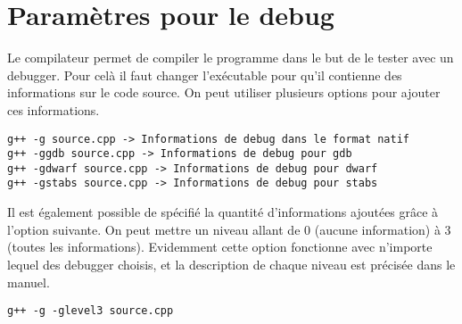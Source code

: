 \documentclass[a4paper, 12pt]{article}
\begin{document}
\section{Paramètres pour le debug}
    Le compilateur permet de compiler le programme dans le but de le tester avec un debugger. Pour celà il faut changer l'exécutable pour qu'il contienne des informations sur le code source.
    On peut utiliser plusieurs options pour ajouter ces informations.
    \begin{mdframed}[backgroundcolor=light-gray, roundcorner=20pt,
        innerleftmargin=20, innertopmargin=1, innerbottommargin=1, 
        outerlinewidth=1, linecolor=darkgray]
        \begin{lstlisting}
g++ -g source.cpp -> Informations de debug dans le format natif
g++ -ggdb source.cpp -> Informations de debug pour gdb
g++ -gdwarf source.cpp -> Informations de debug pour dwarf 
g++ -gstabs source.cpp -> Informations de debug pour stabs
        \end{lstlisting}
    \end{mdframed}
    Il est également possible de spécifié la quantité d'informations ajoutées grâce à l'option suivante.
    On peut mettre un niveau allant de 0 (aucune information) à 3 (toutes les informations).
    Evidemment cette option fonctionne avec n'importe lequel des debugger choisis, et la description de chaque niveau est précisée dans le manuel.
    \begin{mdframed}[backgroundcolor=light-gray, roundcorner=20pt,
        innerleftmargin=20, innertopmargin=1, innerbottommargin=1, 
        outerlinewidth=1, linecolor=darkgray]
        \begin{lstlisting}
g++ -g -glevel3 source.cpp
        \end{lstlisting}
    \end{mdframed}
    
\end{document}
